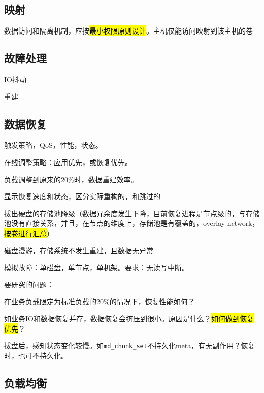 \subsection{映射}

数据访问和隔离机制，应按\hl{最小权限原则设计}。主机仅能访问映射到该主机的卷

\subsection{故障处理}

\begin{enumbox}
\item IO抖动
\item 重建
\end{enumbox}

\subsection{数据恢复}

触发策略，QoS，性能，状态。

\begin{enumbox}
\item 在线调整策略：应用优先，或恢复优先。
\item 负载调整到原来的20\%时，数据重建效率。
\item 显示恢复速度和状态，区分实际重构的，和跳过的
\item 拔出硬盘的存储池降级（数据冗余度发生下降，目前恢复进程是节点级的，与存储池没有直接关系，并且，在节点的维度上，存储池是有覆盖的，overlay network，\hl{按卷进行汇总}）
\item 磁盘漫游，存储系统不发生重建，且数据无异常
\item 模拟故障：单磁盘，单节点，单机架。要求：无读写中断。
\end{enumbox}

要研究的问题：
\begin{enumbox}
\item 在业务负载限定为标准负载的20\%的情况下，恢复性能如何？
\item 如业务IO和数据恢复并存，数据恢复会挤压到很小。原因是什么？\hl{如何做到恢复优先}？
\item 拔盘后，感知状态变化较慢。如\verb|md_chunk_set|不持久化meta，有无副作用？恢复时，也可不持久化。
\end{enumbox}

\subsection{负载均衡}

